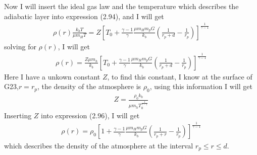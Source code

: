\documentclass[a4paper,11pt,english]{report}
\begin{document}
Now I will insert the ideal gas law and the temperature which describes the
adiabatic layer into expression (2.94), and I will get
\begin{align}
 \rho(r) \frac{k_{b}T}{\mu m_{H}T} = Z[
  T_{0} + \frac{\gamma -1}{\gamma}\frac{\mu
  m_{H}m_{p}G}{k_{b}}(\frac{1}{r_{p}+d} - \frac{1}{r_{p}})
  ]^{\frac{1}{\gamma-1}}
\end{align}
solving for \(\rho (r)\), I will get
\begin{align}
  \rho (r) = \frac{Z\mu m_{h}}{k_{b}}[
  T_{0} + \frac{\gamma -1}{\gamma}\frac{\mu
  m_{H}m_{p}G}{k_{b}}(\frac{1}{r_{p}+d} - \frac{1}{r_{p}})
  ]^{\frac{1}{\gamma-1}}
\end{align}
Here I have a unkown constant \(Z\), to find this constant, I know at the
surface of G23,\(r = r_{p}\), the density of the atmosphere is \(\rho_{0}\), using this
information I will get
\begin{align}
  Z = \frac{\rho_{0}k_{b}}{\mu m_{h}T_{0}^{\frac{1}{\gamma - 1}}}
\end{align}
Inserting \(Z\) into expression (2.96), I will get
\begin{align}
  \rho (r) = \rho_{0}[
  1 + \frac{\gamma -1}{\gamma}\frac{\mu
  m_{H}m_{p}G}{k_{b}}(\frac{1}{r_{p}+r} - \frac{1}{r_{p}})
  ]^{\frac{1}{\gamma-1}}
\end{align}
which describes the density of the atmosphere at the interval \(r_{p} \le r \le
d\).
\end{document}
